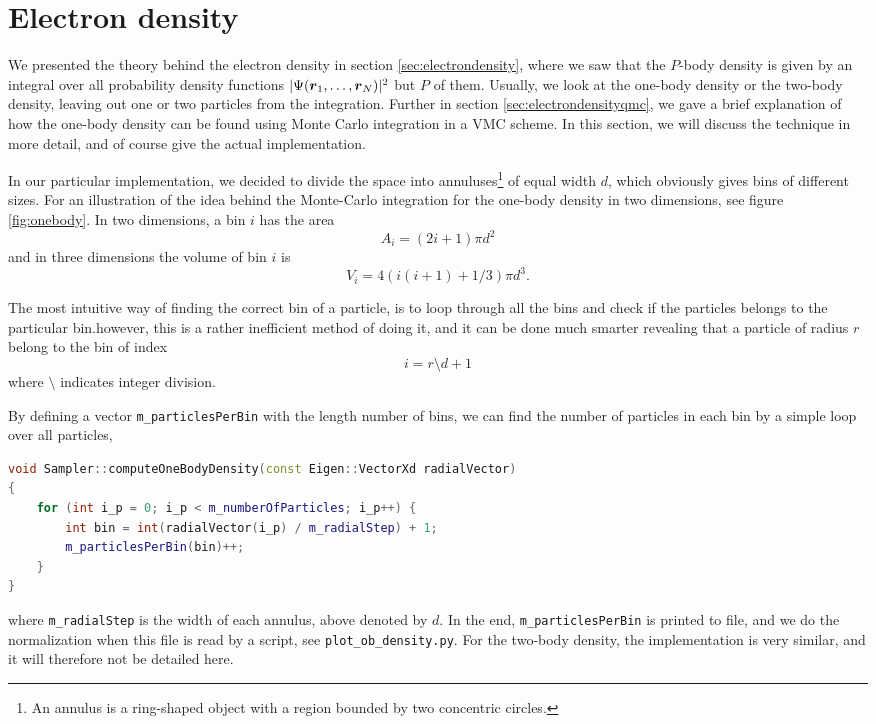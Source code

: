 \section{Electron density} \label{sec:electrondensityimplementation}
We presented the theory behind the electron density in section \ref{sec:electrondensity}, where we saw that the $P$-body density is given by an integral over all probability density functions $|\Psi(\boldsymbol{{r}}_1,\hdots,\boldsymbol{{r}}_N)|^2$ but $P$ of them. Usually, we look at the one-body density or the two-body density, leaving out one or two particles from the integration. Further in section \ref{sec:electrondensityqmc}, we gave a brief explanation of how the one-body density can be found using Monte Carlo integration in a VMC scheme. In this section, we will discuss the technique in more detail, and of course give the actual implementation. 

In our particular implementation, we decided to divide the space into annuluses\footnote{An annulus is a ring-shaped object with a region bounded by two concentric circles.} of equal width $d$, which obviously gives bins of different sizes. For an illustration of the idea behind the Monte-Carlo integration for the one-body density in two dimensions, see figure \eqref{fig:onebody}. In two dimensions, a bin $i$ has the area
\begin{equation}
A_i=(2i+1)\pi d^2
\end{equation}
and in three dimensions the volume of bin $i$ is
\begin{equation}
V_i=4(i(i+1)+1/3)\pi d^3.
\end{equation}

The most intuitive way of finding the correct bin of a particle, is to loop through all the bins and check if the particles belongs to the particular bin.however, this is a rather inefficient method of doing it, and it can be done much smarter revealing that a particle of radius $r$ belong to the bin of index
\begin{equation}
i=r\setminus d + 1
\end{equation}
where $\setminus$ indicates integer division. 

By defining a vector \lstinline|m_particlesPerBin| with the length number of bins, we can find the number of particles in each bin by a simple loop over all particles,
\begin{lstlisting}[language=c++,caption={Taken from \lstinline{sampler.cpp}.}]
void Sampler::computeOneBodyDensity(const Eigen::VectorXd radialVector)
{
	for (int i_p = 0; i_p < m_numberOfParticles; i_p++) {
		int bin = int(radialVector(i_p) / m_radialStep) + 1;
		m_particlesPerBin(bin)++;
	}
}
\end{lstlisting}
where \lstinline|m_radialStep| is the width of each annulus, above denoted by $d$. In the end, \lstinline|m_particlesPerBin| is printed to file, and we do the normalization when this file is read by a script, see \lstinline|plot_ob_density.py|. For the two-body density, the implementation is very similar, and it will therefore not be detailed here. 

